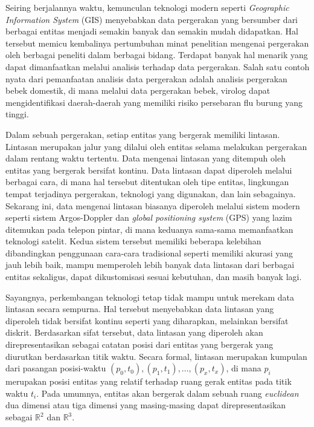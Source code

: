 \documentclass[a4paper,twoside]{article}
\begin{document}


\fi

Seiring berjalannya waktu, kemunculan teknologi modern seperti \textit{Geographic Information System} (GIS) menyebabkan data pergerakan yang bersumber dari berbagai entitas menjadi semakin banyak dan semakin mudah didapatkan. Hal tersebut memicu kembalinya pertumbuhan minat penelitian mengenai pergerakan oleh berbagai peneliti dalam berbagai bidang. Terdapat banyak hal menarik yang dapat dimanfaatkan melalui analisis terhadap data pergerakan. Salah satu contoh nyata dari pemanfaatan analisis data pergerakan adalah analisis pergerakan bebek domestik, di mana melalui data pergerakan bebek, virolog dapat mengidentifikasi daerah-daerah yang memiliki risiko persebaran flu burung yang tinggi.

Dalam sebuah pergerakan, setiap entitas yang bergerak memiliki lintasan. Lintasan merupakan jalur yang dilalui oleh entitas selama melakukan pergerakan dalam rentang waktu tertentu. Data mengenai lintasan yang ditempuh oleh entitas yang bergerak bersifat kontinu. Data lintasan dapat diperoleh melalui berbagai cara, di mana hal tersebut ditentukan oleh tipe entitas, lingkungan tempat terjadinya pergerakan, teknologi yang digunakan, dan lain sebagainya. Sekarang ini, data mengenai lintasan biasanya diperoleh melalui sistem modern seperti sistem Argos-Doppler dan \textit{global positioning system} (GPS) yang lazim ditemukan pada telepon pintar, di mana keduanya sama-sama memanfaatkan teknologi satelit. Kedua sistem tersebut memiliki beberapa kelebihan dibandingkan penggunaan cara-cara tradisional seperti memiliki akurasi yang jauh lebih baik, mampu memperoleh lebih banyak data lintasan dari berbagai entitas sekaligus, dapat dikustomisasi sesuai kebutuhan, dan masih banyak lagi.

Sayangnya, perkembangan teknologi tetap tidak mampu untuk merekam data lintasan secara sempurna. Hal tersebut menyebabkan data lintasan yang diperoleh tidak bersifat kontinu seperti yang diharapkan, melainkan bersifat diskrit. Berdasarkan sifat tersebut, data lintasan yang diperoleh akan direpresentasikan sebagai catatan posisi dari entitas yang bergerak yang diurutkan berdasarkan titik waktu. Secara formal, lintasan merupakan kumpulan dari pasangan posisi-waktu $(p_0, t_0), (p_1, t_1), \ldots, (p_x, t_x)$, di mana $p_i$ merupakan posisi entitas yang relatif terhadap ruang gerak entitas pada titik waktu $t_i$. Pada umumnya, entitas akan bergerak dalam sebuah ruang \textit{euclidean} dua dimensi atau tiga dimensi yang masing-masing dapat direpresentasikan sebagai 
$\mathbb{R}^2$ dan $\mathbb{R}^3$.
\end{document}
